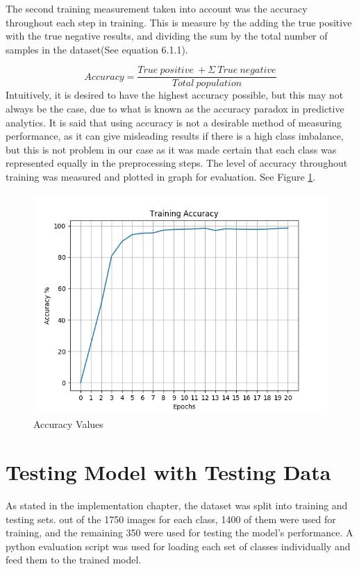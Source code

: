 \newpage

The second training measurement taken into account was the accuracy throughout each step in training. This is measure by the adding the true positive with the true negative results, and dividing the sum by the total number of samples in the dataset(See equation 6.1.1).


\begin{equation}\label{eq:ac}
Accuracy = 
\frac{
	True\ positive\ + Σ\ True\ negative
}{
	Total\ population
}
\end{equation}
Intuitively, it is desired to have the highest accuracy possible, but this may not always be the case, due to what is known as the accuracy paradox in predictive analytics. It is said that using accuracy is not a desirable method of measuring performance, as it can give misleading results if there is a high class imbalance, but this is not problem in our case as it was made certain that each class was represented equally in the preprocessing steps.  The level of accuracy throughout training was measured and plotted in graph for evaluation. See Figure \ref{acc}.

\begin{figure}[ht]
	\begin{center}
		\advance\leftskip-3cm
		\advance\rightskip-3cm
		\includegraphics[keepaspectratio=true,scale=0.7]{__resources/Results/accuracy.jpg}
		\caption{Accuracy Values}
		\label{acc}
	\end{center}
\end{figure}

\newpage

\section{Testing Model with Testing Data}
As stated in the implementation chapter, the dataset was split into training and testing sets. out of the 1750 images for each class, 1400 of them were used for training, and the remaining 350 were used for testing the model's performance. A python evaluation script was used for loading each set of classes individually and feed them to the trained model. 

